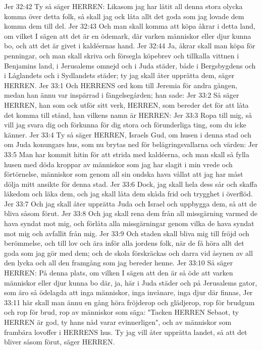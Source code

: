 Jer 32:42  Ty så säger HERREN: Likasom jag har låtit all denna stora olycka komma över detta folk, så skall jag ock låta allt det goda som jag lovade dem komma dem till del.
Jer 32:43  Och man skall komma att köpa åkrar i detta land, om vilket I sägen att det är en ödemark, där varken människor eller djur kunna bo, och att det är givet i kaldéernas hand.
Jer 32:44  Ja, åkrar skall man köpa för penningar, och man skall skriva och försegla köpebrev och tillkalla vittnen i Benjamins land, i Jerusalems omnejd och i Juda städer, både i Bergsbygdens och i Låglandets och i Sydlandets städer; ty jag skall åter upprätta dem, säger HERREN.
Jer 33:1  Och HERRENS ord kom till Jeremia för andra gången, medan han ännu var inspärrad i fängelsegården; han sade:
Jer 33:2  Så säger HERREN, han som ock utför sitt verk, HERREN, som bereder det för att låta det komma till stånd, han vilkens namn är HERREN:
Jer 33:3  Ropa till mig, så vill jag svara dig och förkunna för dig stora och förunderliga ting, som du icke känner.
Jer 33:4  Ty så säger HERREN, Israels Gud, om husen i denna stad och om Juda konungars hus, som nu brytas ned för belägringsvallarna och värden:
Jer 33:5  Man har kommit hitin för att strida med kaldéerna, och man skall så fylla husen med döda kroppar av människor som jag har slagit i min vrede och förtörnelse, människor som genom all sin ondska hava vållat att jag har måst dölja mitt ansikte för denna stad.
Jer 33:6  Dock, jag skall hela dess sår och skaffa läkedom och läka dem, och jag skall låta dem skåda frid och trygghet i överflöd.
Jer 33:7  Och jag skall åter upprätta Juda och Israel och uppbygga dem, så att de bliva såsom förut.
Jer 33:8  Och jag skall rena dem från all missgärning varmed de hava syndat mot mig, och förlåta alla missgärningar genom vilka de hava syndat mot mig och avfallit från mig.
Jer 33:9  Och staden skall bliva mig till fröjd och berömmelse, och till lov och ära inför alla jordens folk, när de få höra allt det goda som jag gör med dem; och de skola förskräckas och darra vid åsynen av all den lycka och all den framgång som jag bereder henne.
Jer 33:10  Så säger HERREN: På denna plats, om vilken I sägen att den är så öde att varken människor eller djur kunna bo där, ja, här i Juda städer och på Jerusalems gator, som äro så ödelagda att inga människor, inga invånare, inga djur där finnas,
Jer 33:11  här skall man ännu en gång höra fröjderop och glädjerop, rop för brudgum och rop för brud, rop av människor som säga: "Tacken HERREN Sebaot, ty HERREN är god, ty hans nåd varar evinnerligen", och av människor som frambära lovoffer i HERRENS hus. Ty jag vill åter upprätta landet, så att det bliver såsom förut, säger HERREN.
